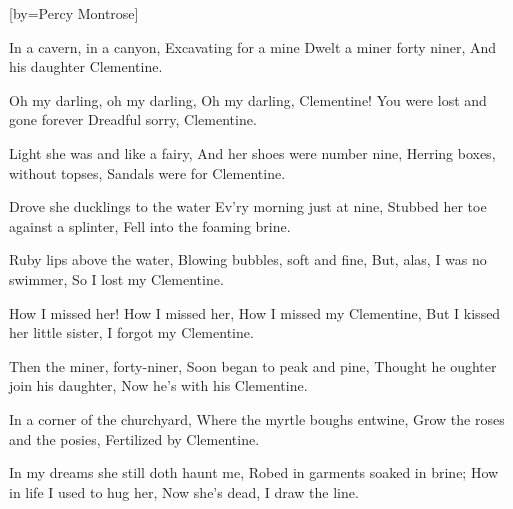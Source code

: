 [by={Percy Montrose}]

\beginverse
In a cavern, in a canyon,
Excavating for a mine
Dwelt a miner forty niner,
And his daughter Clementine.
\endverse

\beginchorus
Oh my darling, oh my darling,
Oh my darling, Clementine!
You were lost and gone forever
Dreadful sorry, Clementine.
\endchorus

\beginverse
Light she was and like a fairy,
And her shoes were number nine,
Herring boxes, without topses,
Sandals were for Clementine.
\endverse

\beginverse
Drove she ducklings to the water
Ev'ry morning just at nine,
Stubbed her toe against a splinter,
Fell into the foaming brine.
\endverse

\beginverse
Ruby lips above the water,
Blowing bubbles, soft and fine,
But, alas, I was no swimmer,
So I lost my Clementine.
\endverse

\beginverse
How I missed her! How I missed her,
How I missed my Clementine,
But I kissed her little sister,
I forgot my Clementine.
\endverse

\beginverse
Then the miner, forty-niner,
Soon began to peak and pine,
Thought he oughter join his daughter,
Now he's with his Clementine.
\endverse

\beginverse
In a corner of the churchyard,
Where the myrtle boughs entwine,
Grow the roses and the posies,
Fertilized by Clementine.
\endverse

\beginverse
In my dreams she still doth haunt me,
Robed in garments soaked in brine;
How in life I used to hug her,
Now she's dead, I draw the line.
\endverse
\endsong
